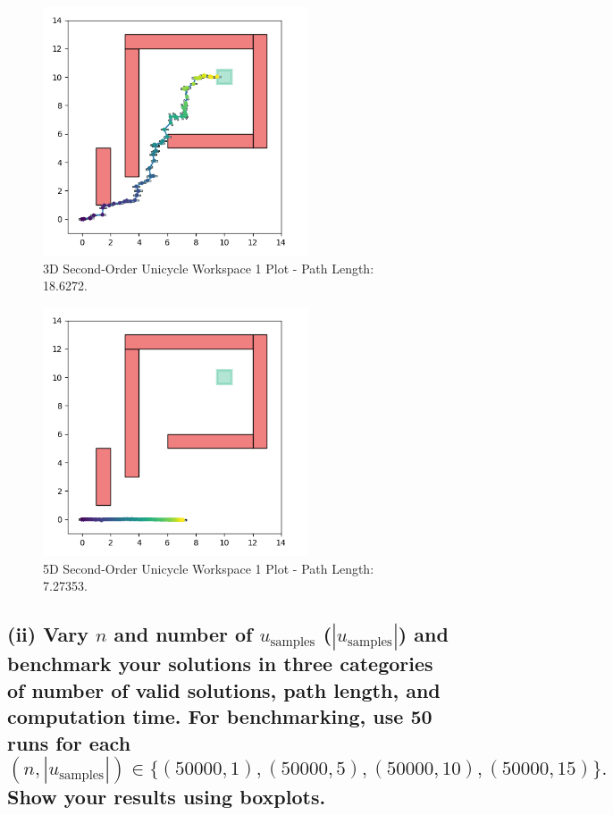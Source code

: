 \documentclass{article}
\begin{document}
\begin{figure}[H]
    \centering
    \includegraphics[width=0.7\textwidth]{1di2.png} 
    \caption{3D Second-Order Unicycle Workspace 1 Plot - Path Length: 18.6272.}
    \label{fig:1di2}
\end{figure}

\begin{figure}[H]
    \centering
    \includegraphics[width=0.7\textwidth]{1di4.png} 
    \caption{5D Second-Order Unicycle Workspace 1 Plot - Path Length: 7.27353.}
    \label{fig:1di4}
\end{figure}

\subsection*{(ii)
Vary \( n \) and number of \( u_{\text{samples}} \) (\( |u_{\text{samples}}| \)) and benchmark your solutions in three categories of number of valid solutions, path length, and computation time. For benchmarking, use 50 runs for each
\[
    (n, |u_{\text{samples}}|) \in \{ (50000, 1), (50000, 5), (50000, 10), (50000, 15) \}.
    \]    
    Show your results using boxplots.
}
\end{document}
